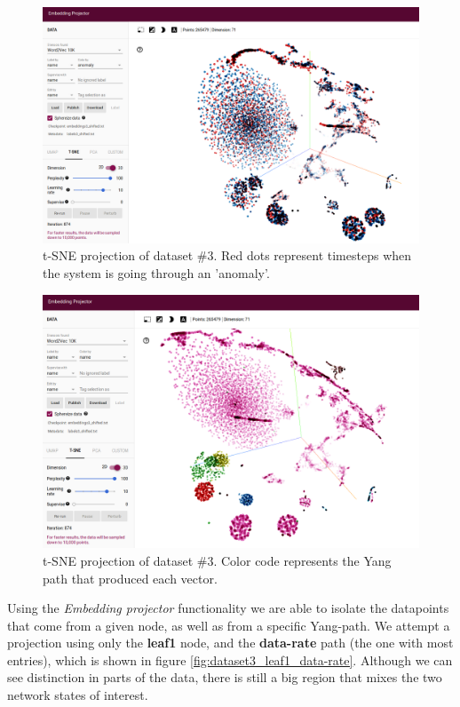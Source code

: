 \begin{figure}[h!]
	\centering
	\includegraphics[width=0.8\linewidth]{Figure/dataset3_all_P100.png}
	\caption{t-SNE projection of dataset \#3. Red dots represent timesteps when the system is going through an 'anomaly'.}
	\label{fig:dataset3_all_P100}
\end{figure}
\begin{figure}[h!]
	\centering
	\includegraphics[width=0.8\linewidth]{Figure/dataset3_all_P100_name.png}
	\caption{t-SNE projection of dataset \#3. Color code represents the Yang path that produced each vector.}
	\label{fig:dataset3_all_P100_names}
\end{figure}

Using the \textit{Embedding projector} functionality we are able to isolate the datapoints that come from a given node, as well as from a specific Yang-path.
We attempt a projection using only the \textbf{leaf1} node, and the \textbf{data-rate} path (the one with most entries), which is shown in figure \ref{fig:dataset3_leaf1_data-rate}.
Although we can see distinction in parts of the data, there is still a big region that mixes the two network states of interest.

